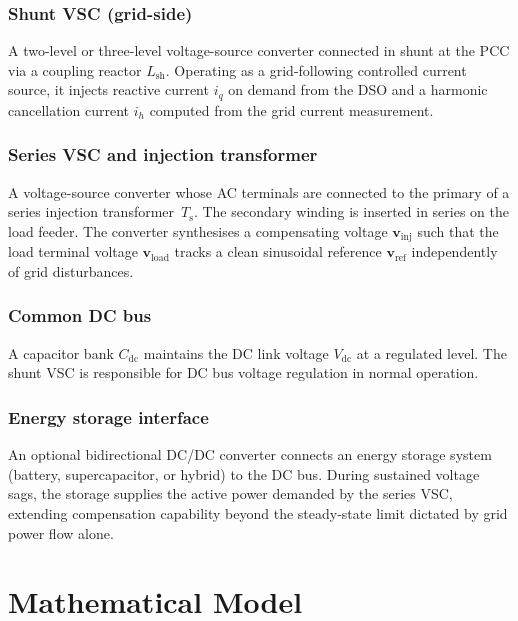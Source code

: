 \documentclass[conference]{IEEEtran}
\begin{document}
\subsubsection{Shunt VSC (grid-side)}
A two-level or three-level voltage-source converter connected in
shunt at the PCC via a coupling reactor $L_\text{sh}$.
Operating as a grid-following controlled current source, it injects
reactive current $i_q$ on demand from the DSO and a harmonic
cancellation current $i_h$ computed from the grid current measurement.

\subsubsection{Series VSC and injection transformer}
A voltage-source converter whose AC terminals are connected to
the primary of a series injection transformer~$T_\text{s}$.
The secondary winding is inserted in series on the load feeder.
The converter synthesises a compensating voltage
$\bm{v}_\text{inj}$ such that the load terminal voltage
$\bm{v}_\text{load}$ tracks a clean sinusoidal reference
$\bm{v}_\text{ref}$ independently of grid disturbances.

\subsubsection{Common DC bus}
A capacitor bank $C_\text{dc}$ maintains the DC link voltage
$V_\text{dc}$ at a regulated level. The shunt VSC is responsible for
DC bus voltage regulation in normal operation.

\subsubsection{Energy storage interface}
An optional bidirectional DC/DC converter connects an energy storage
system (battery, supercapacitor, or hybrid) to the DC bus.
During sustained voltage sags, the storage supplies the active power
demanded by the series VSC, extending compensation capability
beyond the steady-state limit dictated by grid power flow alone.


\section{Mathematical Model}
\label{sec:model}
\end{document}
